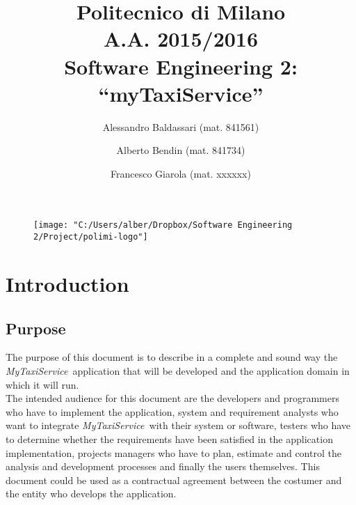 \documentclass[a4paper,11pt]{report} %
\title{Politecnico di Milano\\A.A. 2015/2016\\Software Engineering 2: ``myTaxiService''}
\author{Alessandro Baldassari (mat. 841561) \and Alberto Bendin (mat. 841734) \and Francesco Giarola (mat. xxxxxx)}
\newcommand{\mts}{\mbox{\normalfont\itshape MyTaxiService\ }}
\begin{document}
	
	
	\begin{figure}[t]
		\centering
		\texttt{[image: "C:/Users/alber/Dropbox/Software Engineering 2/Project/polimi-logo"]}
		\label{fig:polimi-logo}
	\end{figure}
	
	\maketitle
		
	

	\thispagestyle{empty}
	\clearpage\mbox{}\clearpage
	
	
	
	\renewcommand*\thesection{\arabic{section}}
	\renewcommand*\thesubsection{\arabic{section}.\arabic{subsection}}
	\renewcommand*\thesubsubsection{%
		\arabic{section}.\arabic{subsection}.\arabic{subsubsection}%
	}
	\setcounter{secnumdepth}{3}
	\setcounter{tocdepth}{3}
		
	
	\tableofcontents
	\newpage
	
	
	
	\section{Introduction}
	
	\subsection{Purpose} The purpose of this document is to describe in a complete and sound way
	the \mts application that will be developed and the application domain in which it will run.\\
	The intended audience for this document are the developers and programmers
	who have to implement the application, system and requirement
	analysts who want to integrate \mts with their system or software,
	testers who have to determine whether the requirements have been satisfied in
	the application implementation, projects managers who have to plan, estimate
	and control the analysis and development processes and finally the users themselves.
	This document could be used as a contractual agreement between the costumer
	and the entity who develops the application.
	
\end{document}
